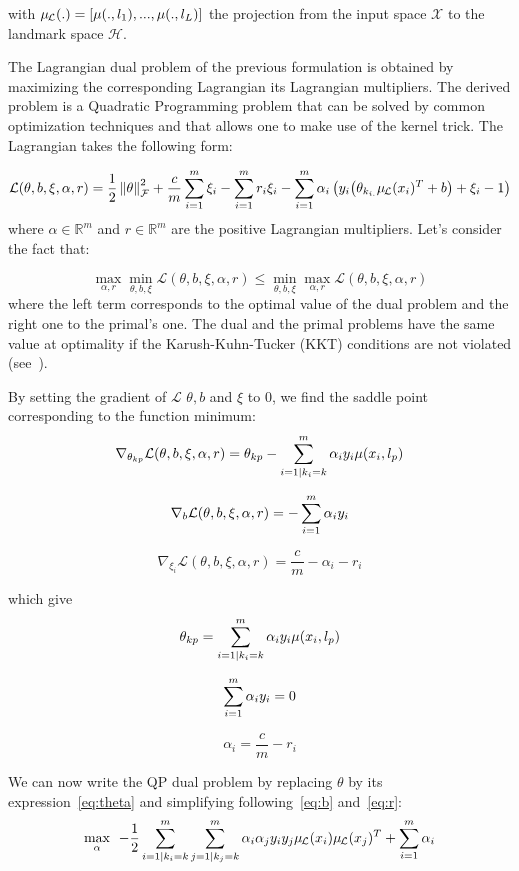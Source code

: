 with $\mul{.} = [\mu(.,l_1),...,\mu(.,l_L)]$ the projection from the input space $\mathcal{X}$ to the landmark space $\mathcal{H}$.

The Lagrangian dual problem of the previous formulation is obtained by maximizing the corresponding Lagrangian \wrt its Lagrangian multipliers. The derived problem is a Quadratic Programming problem that can be solved by common optimization techniques and that allows one to make use of the kernel trick. The Lagrangian takes the following form:

$$ \mathcal{L}(\theta,b,\xi,\alpha,r) = \frac{1}{2} \normf{\theta}^2 + \frac{c}{m}\sumi \xi_i-\sumi r_i \xi_i -\sumi \alpha_i \left(y_i \big(\theta_{k_{i.}} \mul{x_i}^T + b \big) + \xi_i-1\right)$$
where $\alpha \in \mathbb{R}^{m}$ and $r \in \mathbb{R}^{m}$ are the positive Lagrangian multipliers.
Let's consider the fact that:

$$ \max_{\alpha,r} \min_{\theta,b,\xi} \mathcal{L}(\theta,b,\xi,\alpha,r) \leq \min_{\theta,b,\xi} \max_{\alpha,r} \mathcal{L}(\theta,b,\xi,\alpha,r) $$
where the left term corresponds to the optimal value of the dual problem and the right one to the primal's one. The dual and the primal problems have the same value at optimality if the Karush-Kuhn-Tucker (KKT) conditions are not violated (see~\cite{boyd2004convex}).

By setting the gradient of $\mathcal{L}$ \wrt $\theta, b$ and $\xi$ to 0, we find the saddle point corresponding to the function minimum:
$$ \nabla_{\theta_{kp}}\mathcal{L}(\theta,b,\xi,\alpha,r) = \theta_{kp} - \sum_{i=1 | k_{i}=k}^m \alpha_i y_i \mu(x_i,l_p)$$

$$\nabla_{b}\mathcal{L}(\theta,b,\xi,\alpha,r) = - \sum_{i=1}^m \alpha_i y_i $$

$$\nabla_{\xi_i}\mathcal{L}(\theta,b,\xi,\alpha,r) = \frac{c}{m} - \alpha_i - r_i$$

which give
\begin{equation} \label{eq:theta}
\theta_{kp} = \sum_{i=1 | k_{i}=k}^m \alpha_i y_i \mu(x_i,l_p)
\end{equation}

\begin{equation} \label{eq:b}
\sum_{i=1}^m \alpha_i y_i = 0
\end{equation}

\begin{equation} \label{eq:r}
\alpha_i = \frac{c}{m} - r_i
\end{equation}

We can now write the QP dual problem by replacing $\theta$ by its expression~\eqref{eq:theta} and simplifying following~\eqref{eq:b} and~\eqref{eq:r}:
$$ \max_{\alpha} \:\: -\frac{1}{2}\sumik{i}\sumik{j} \alpha_i \alpha_j y_i y_j \mul{x_i}\mul{x_j}^T + \sumi \alpha_i$$

